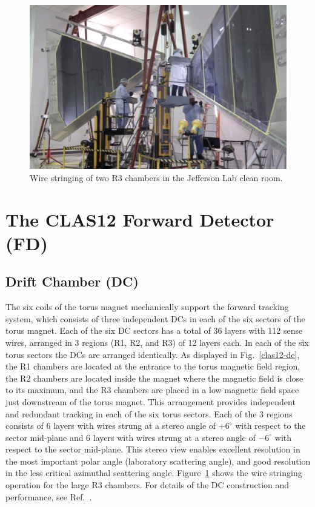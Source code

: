 \documentclass[final,3p,twocolumn]{elsarticle}
\begin{document}
\begin{figure}[htbp!]
\centerline{\includegraphics[width=1.65\columnwidth]{DC-R3.png}}
\caption{Wire stringing of two R3 chambers in the Jefferson Lab clean room.}
\label{dc-stringing}
\end{figure}

\section{The CLAS12 Forward Detector (FD)}

\subsection{Drift Chamber (DC)}

The six coils of the torus magnet mechanically support the forward tracking system, which consists of three
independent DCs in each of the six sectors of the torus magnet. Each of the six DC sectors has a total of 36
layers with 112 sense wires, arranged in 3 regions (R1, R2, and R3) of 12 layers each. In each of the six torus
sectors the DCs are arranged identically. As displayed in Fig.~\ref{clas12-dc}, the R1 chambers are located at
the entrance to the torus magnetic field region, the R2 chambers are located inside the magnet where the
magnetic field is close to its maximum, and the R3 chambers are placed in a low magnetic field space just
downstream of the torus magnet. This arrangement provides independent and redundant tracking in each of the
six torus sectors. Each of the 3 regions consists of 6 layers with wires strung at a stereo angle of $+6^\circ$
with respect to the sector mid-plane and 6 layers with wires strung at a stereo angle of $-6^\circ$ with respect
to the sector mid-plane. This stereo view enables excellent resolution in the most important polar angle (laboratory
scattering angle), and good resolution in the less critical azimuthal scattering angle. Figure~\ref{dc-stringing}
shows the wire stringing operation for the large R3 chambers. For details of the DC construction and performance,
see Ref.~\cite{DC}.
\end{document}
